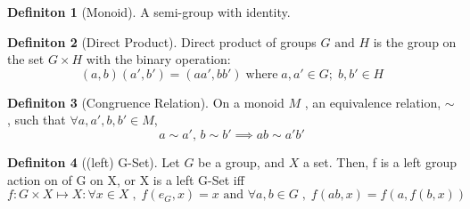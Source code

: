 \documentclass{article}
\theoremstyle{definition}
\theoremstyle{definition}
\newtheorem{definition}{Definiton}[section]
\begin{document}
\begin{definition}[Monoid] %
	A semi-group with identity.
\end{definition}

\begin{definition}[Direct Product] %
	Direct product of groups $ G \text{ and } H $ is the group on the set $ G \times H $ with the binary operation:
\[ (a,b)(a',b')=(aa',bb') \; \text{where} \; a,a' \in G; \; b,b' \in H\]
\end{definition}

\begin{definition}[Congruence Relation] %
On a monoid $ M $ , an equivalence relation, $ \sim $ , such that $ \forall a,a',b,b' \in M $,
\[ a \sim a' ,\, b\sim b' \implies ab \sim a'b'  \]
\end{definition}

\begin{definition}[(left) G-Set] %
Let $ G $ be a group, and $ X $ a set. Then, f is a left group action on of G on X, or X is a left G-Set iff
\[ f:G \times X \mapsto X : \forall x \in X \; , \;   f(e_G,x)=x \text{ and } \forall a,b \in G \; , \; f(ab,x)=f(a, f(b,x))  \]
\end{definition}
\end{document}
